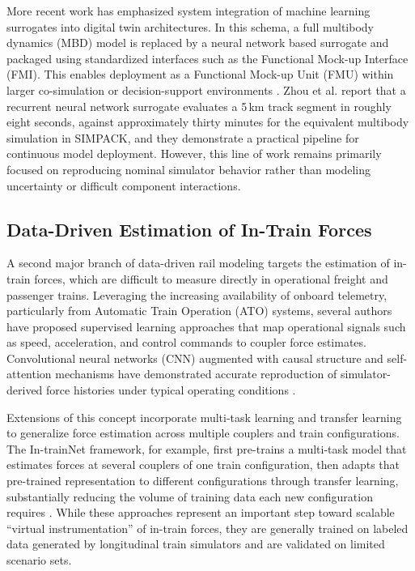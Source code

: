 More recent work has emphasized system integration of machine learning surrogates into digital twin architectures. In this schema, a full multibody dynamics (MBD) model is replaced by a neural network based surrogate and packaged using standardized interfaces such as the Functional Mock-up Interface (FMI). This enables deployment as a Functional Mock-up Unit (FMU) within larger co-simulation or decision-support environments \cite{zhou_surrogate_integration}. Zhou et al. report that a recurrent neural network surrogate evaluates a 5\,km track segment in roughly eight seconds, against approximately thirty minutes for the equivalent multibody simulation in SIMPACK, and they demonstrate a practical pipeline for continuous model deployment. However, this line of work remains primarily focused on reproducing nominal simulator behavior rather than modeling uncertainty or difficult component interactions.

\subsection{Data-Driven Estimation of In-Train Forces}

A second major branch of data-driven rail modeling targets the estimation of in-train forces, which are difficult to measure directly in operational freight and passenger trains. Leveraging the increasing availability of onboard telemetry, particularly from Automatic Train Operation (ATO) systems, several authors have proposed supervised learning approaches that map operational signals such as speed, acceleration, and control commands to coupler force estimates. Convolutional neural networks (CNN) augmented with causal structure and self-attention mechanisms have demonstrated accurate reproduction of simulator-derived force histories under typical operating conditions \cite{zhang_in_train_forces}.

Extensions of this concept incorporate multi-task learning and transfer learning to generalize force estimation across multiple couplers and train configurations. The In-trainNet framework, for example, first pre-trains a multi-task model that estimates forces at several couplers of one train configuration, then adapts that pre-trained representation to different configurations through transfer learning, substantially reducing the volume of training data each new configuration requires \cite{intrainnet}. While these approaches represent an important step toward scalable “virtual instrumentation” of in-train forces, they are generally trained on labeled data generated by longitudinal train simulators and are validated on limited scenario sets.

